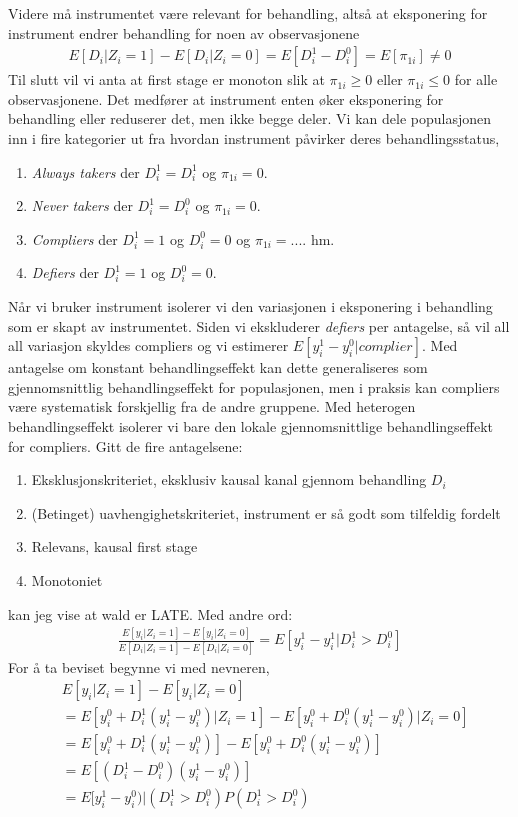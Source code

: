 Videre må instrumentet være relevant for behandling, altså at eksponering for instrument endrer behandling for noen av observasjonene
\begin{align}
E[D_i|Z_i=1]-E[D_i|Z_i=0] = E[D_i^1-D_i^0] =E[\pi_{1i}] \neq 0
\end{align}
Til slutt vil vi anta at first stage er monoton slik at $\pi_{1i} \geq 0$ eller $\pi_{1i} \leq 0$ for alle observasjonene. Det medfører at instrument enten øker eksponering for behandling eller reduserer det, men ikke begge deler. Vi kan dele populasjonen inn i fire kategorier ut fra hvordan instrument påvirker deres behandlingsstatus,
\begin{enumerate}
\item \textit{Always takers} der $D_i^1=D_i^1$ og $\pi_{1i}=0$. 
\item \textit{Never takers} der $D_i^1=D_i^0$ og $\pi_{1i}=0$. 
\item \textit{Compliers} der $D_i^1=1$ og $D_i^0=0$ og $\pi_{1i}=...$. hm.  
\item \textit{Defiers} der $D_i^1=1$ og $D_i^0=0$.
\end{enumerate}
Når vi bruker instrument isolerer vi den variasjonen i eksponering i behandling som er skapt av instrumentet. Siden vi ekskluderer \textit{defiers} per antagelse, så vil all all variasjon skyldes compliers og vi estimerer $E[y_i^1-y_i^0|\textit{complier}]$. Med antagelse om konstant behandlingseffekt kan dette generaliseres som gjennomsnittlig behandlingseffekt for populasjonen, men i praksis kan compliers være systematisk forskjellig fra de andre gruppene. Med heterogen behandlingseffekt isolerer vi bare den lokale gjennomsnittlige behandlingseffekt for compliers. Gitt de fire antagelsene:
\begin{enumerate}
\item Eksklusjonskriteriet, eksklusiv kausal kanal gjennom behandling $D_i$
\item (Betinget) uavhengighetskriteriet, instrument er så godt som tilfeldig fordelt
\item Relevans, kausal first stage
\item Monotoniet
\end{enumerate}
kan jeg vise at wald er LATE. Med andre ord:
\begin{align}
\frac{E[y_i|Z_i=1]-E[y_i|Z_i=0]}{E[D_i|Z_i=1]-E[D_i|Z_i=0]} = E[y_i^1-y_i^1|D_i^1>D_i^0]
\end{align}
For å ta beviset begynne vi med nevneren,
\begin{align}
&E[y_i|Z_i=1]-E[y_i|Z_i=0] \\
&= E[y_i^0+D_i^1(y_i^1-y_i^0)|Z_i=1] - E[y_i^0+D_i^0(y_i^1-y_i^0)|Z_i=0] \\
&= E[y_i^0+D_i^1(y_i^1-y_i^0)] - E[y_i^0+D_i^0(y_i^1-y_i^0)] \\
&= E[(D_i^1-D_i^0)(y_i^1-y_i^0)] \\
&= E[y_i^1-y_i^0)|(D_i^1>D_i^0)P(D_i^1>D_i^0)
\end{align}
